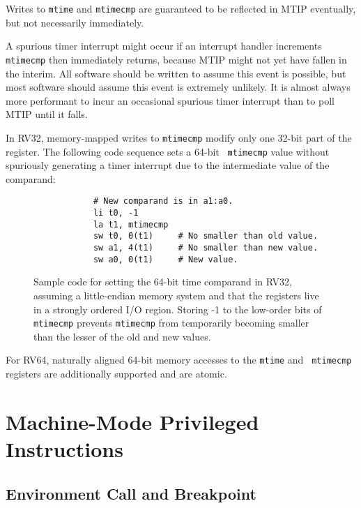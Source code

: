 Writes to {\tt mtime} and {\tt mtimecmp} are guaranteed to be reflected in
MTIP eventually, but not necessarily immediately.

\begin{commentary}
	A spurious timer interrupt might occur if an interrupt handler increments {\tt
		mtimecmp} then immediately returns, because MTIP might not yet have fallen in
	the interim.  All software should be written to assume this event is possible,
	but most software should assume this event is extremely unlikely.  It is
	almost always more performant to incur an occasional spurious timer interrupt
	than to poll MTIP until it falls.
\end{commentary}

In RV32, memory-mapped writes to {\tt mtimecmp} modify only one 32-bit
part of the register.  The following code sequence sets a 64-bit {\tt
	mtimecmp} value without spuriously generating a timer interrupt due
to the intermediate value of the comparand:

\begin{figure}[h!]
	\begin{center}
		\begin{verbatim}
			# New comparand is in a1:a0.
			li t0, -1
			la t1, mtimecmp
			sw t0, 0(t1)     # No smaller than old value.
			sw a1, 4(t1)     # No smaller than new value.
			sw a0, 0(t1)     # New value.
		\end{verbatim}
	\end{center}
	\caption{Sample code for setting the 64-bit time comparand in RV32, assuming
		a little-endian memory system and that the registers live in a strongly
		ordered I/O region.  Storing -1 to the low-order bits of {\tt mtimecmp}
		prevents {\tt mtimecmp} from temporarily becoming smaller than the lesser
		of the old and new values.}
	\label{mtimecmph}
\end{figure}

For RV64, naturally aligned 64-bit memory accesses to the {\tt mtime} and {\tt
	mtimecmp} registers are additionally supported and are atomic.

\section{Machine-Mode Privileged Instructions}

\subsection{Environment Call and Breakpoint}

